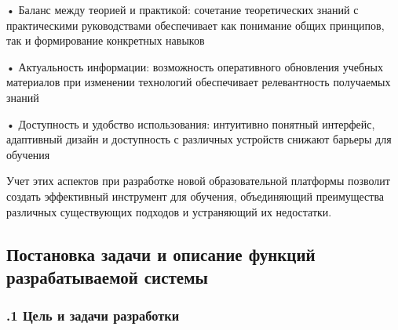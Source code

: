 {  \par \redline • Баланс между теорией и практикой: сочетание теоретических знаний с практическими руководствами обеспечивает как понимание общих принципов, так и формирование конкретных навыков
  
  \par \redline • Актуальность информации: возможность оперативного обновления учебных материалов при изменении технологий обеспечивает релевантность получаемых знаний
  
  \par \redline • Доступность и удобство использования: интуитивно понятный интерфейс, адаптивный дизайн и доступность с различных устройств снижают барьеры для обучения

  \par \redline Учет этих аспектов при разработке новой образовательной платформы позволит создать эффективный инструмент для обучения, объединяющий преимущества различных существующих подходов и устраняющий их недостатки.

  \par
}



\subsection*{
  \gostTitleFont
   Постановка задачи и описание функций разрабатываемой системы
}

\titlespace

\subsubsection*{ 
  \gostTitleFont
  .1 Цель и задачи разработки
} 

\subtitlespace

